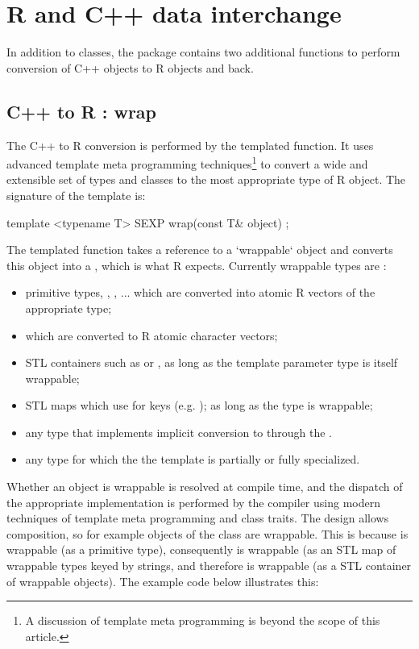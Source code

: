\section{R and C++ data interchange}

In addition to classes, the  package contains two additional
functions to perform conversion of C++ objects to R objects and back. 

\subsection{C++ to R : wrap}

The C++ to R conversion is performed by the  templated
function. It uses advanced template meta programming techniques\footnote{A
  discussion of template meta programming is beyond the scope of this
  article.}  to convert a wide and extensible set of types and classes to the
most appropriate type of R object. The signature of the  template
is:

\begin{example}
template <typename T> 
SEXP wrap(const T& object) ;
\end{example}

The templated function takes a reference to a `wrappable` 
object and converts this object into a , which is what R expects. 
Currently wrappable types are :
\begin{itemize}
\item primitive types, , , ... which are converted 
into atomic R vectors of the appropriate type;
\item {} which are converted to R atomic character vectors;
\item STL containers such as  or , 
as long as the template parameter type  is itself wrappable;
\item STL maps which use  for keys 
(e.g. ); as long as 
the type  is wrappable;
\item any type that implements implicit conversion to  through the 
.
\item any type for which the the  template is partially or fully 
specialized.
\end{itemize}

Whether an object is wrappable is resolved at compile time, and the 
dispatch of the appropriate implementation is performed by the compiler
using modern techniques of template meta programming and class traits.
The design allows composition, so for example objects of the class
 are wrappable. This is 
because  is wrappable (as a primitive type), consequently 
 is wrappable (as an STL map of 
wrappable types keyed by strings, and therefore
 is wrappable (as a 
STL container of wrappable objects). The example code below
illustrates this: 

